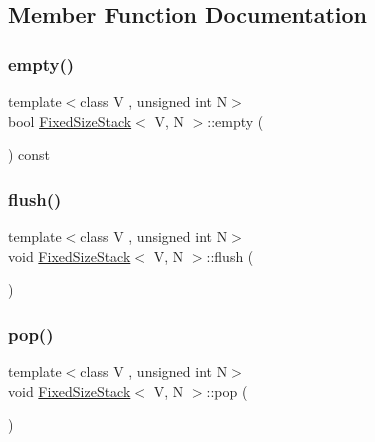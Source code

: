 \subsection{Member Function Documentation}
\mbox{\label{classFixedSizeStack_a6271318779d6b69768a28a5675fa9136}} 
\subsubsection{\texorpdfstring{empty()}{empty()}}
{\footnotesize\ttfamily template$<$class V , unsigned int N$>$ \\
bool \mbox{\hyperlink{classFixedSizeStack}{Fixed\+Size\+Stack}}$<$ V, N $>$\+::empty (\begin{DoxyParamCaption}{ }\end{DoxyParamCaption}) const\hspace{0.3cm}{\ttfamily [inline]}}

\mbox{\label{classFixedSizeStack_a62d9af2dd2c3d9e852a297483f4c4c50}} 
\subsubsection{\texorpdfstring{flush()}{flush()}}
{\footnotesize\ttfamily template$<$class V , unsigned int N$>$ \\
void \mbox{\hyperlink{classFixedSizeStack}{Fixed\+Size\+Stack}}$<$ V, N $>$\+::flush (\begin{DoxyParamCaption}{ }\end{DoxyParamCaption})\hspace{0.3cm}{\ttfamily [inline]}}

\mbox{\label{classFixedSizeStack_a544e3fb119f4b93093db0f52b62bffb1}} 
\subsubsection{\texorpdfstring{pop()}{pop()}}
{\footnotesize\ttfamily template$<$class V , unsigned int N$>$ \\
void \mbox{\hyperlink{classFixedSizeStack}{Fixed\+Size\+Stack}}$<$ V, N $>$\+::pop (\begin{DoxyParamCaption}{ }\end{DoxyParamCaption})\hspace{0.3cm}{\ttfamily [inline]}}

